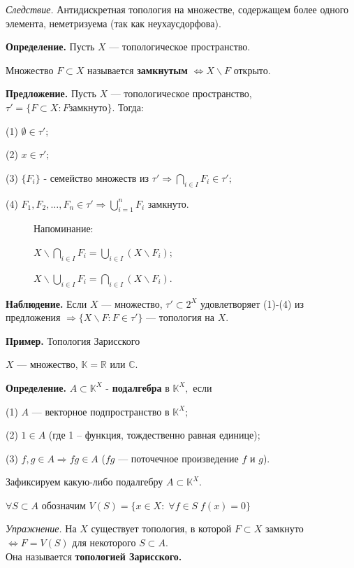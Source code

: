 \documentclass[12pt,a4paper]{article}
\begin{document}
\textit{Следствие.} Антидискретная топология на множестве, содержащем более одного элемента, неметризуема (так как неухаусдорфова).

\textbf{Определение.} Пусть $X$ --- топологическое пространство.

Множество $F \subset X$ называется \textbf{замкнутым} $\Leftrightarrow X \backslash F$ открыто.

\textbf{Предложение.} Пусть $X$ --- топологическое пространство, $\tau' = \{ F \subset X: F \text{замкнуто}\}$. Тогда:

(1) $\emptyset \in \tau';$

(2) $x \in \tau';$

(3) $\{F_i\}$ - семейство множеств из $\tau' \Rightarrow \bigcap_{i \in I} F_i \in \tau';$

(4) $F_1, F_2, \ldots, F_n \in \tau' \Rightarrow \bigcup^n_{i = 1} F_i$ замкнуто.

\begin{figure}
	Напоминание:
	
	$X \backslash \bigcap_{i \in I} F_i = \bigcup_{i \in I}\left( X \backslash F_i \right);$
	
	$X \backslash \bigcup_{i \in I} F_i = \bigcap_{i \in I}\left( X \backslash F_i \right).$
\end{figure}


\textbf{Наблюдение.} Если $X$ --- множество, $\tau' \subset 2^X$ удовлетворяет (1)-(4) из предложения $\Rightarrow \{X \backslash F \colon F \in \tau'\}$ --- топология на $X.$

\textbf{Пример.} Топология Зарисского

$X$ --- множество, $\mathbb{K} = \mathbb{R}$ или $\mathbb{C}$.

\textbf{Определение.} $A \subset \mathbb{K}^X$ - \textbf{подалгебра} в $\mathbb{K}^X,$ если

(1) $A$ --- векторное подпространство в $\mathbb{K}^X;$

(2) $1 \in A$ (где 1 -- функция, тождественно равная единице);

(3) $f, g \in A \Rightarrow fg \in A$ ($fg$ --- поточечное произведение $f$ и $g$).

Зафиксируем какую-либо подалгебру $A \subset \mathbb{K}^X.$

$\forall S \subset A$ обозначим $V(S) = \{ x \in X: \; \forall f \in S \; f(x) = 0 \}$ 

\textit{Упражнение.} На $X$ существует топология, в которой $F \subset X$ замкнуто $\Leftrightarrow F = V(S)$ для некоторого $S \subset A$. \\Она называется \textbf{топологией Зарисского.}
\end{document}
